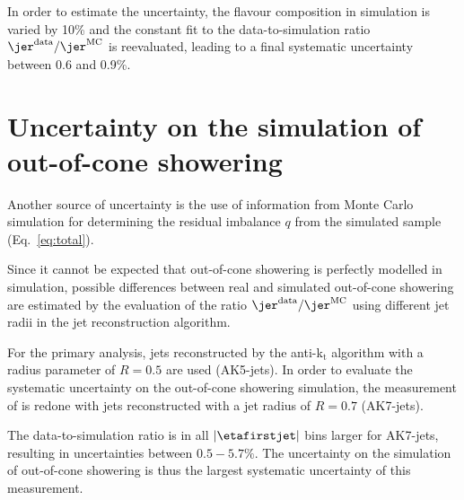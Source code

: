 In order to estimate the uncertainty, the flavour composition in simulation is varied by 10\% 
and the constant fit to the data-to-simulation ratio $\jer^{\text{data}}/\jer^{\text{MC}}$ is reevaluated, leading to a final systematic uncertainty between 0.6 and 0.9\%.

\section*{Uncertainty on the simulation of out-of-cone showering}
Another source of uncertainty is the use of information from Monte Carlo simulation for determining the residual imbalance $q$ from the simulated \GAMJET sample (Eq.~\eqref{eq:total}).

Since it cannot be expected that out-of-cone showering is perfectly modelled in simulation, possible differences between real and simulated out-of-cone showering are estimated by the evaluation of the ratio $\jer^{\text{data}}/\jer^{\text{MC}}$ using different jet radii in the jet reconstruction algorithm. 

For the primary analysis, jets reconstructed by the anti-k$_{\text{t}}$ algorithm with a radius parameter of $R=0.5$ are used (AK5-jets). 
In order to evaluate the systematic uncertainty on the out-of-cone showering simulation, the measurement of \rhores is redone with jets reconstructed with a jet radius of $R=0.7$ (AK7-jets). 

The data-to-simulation ratio is in all $|\etafirstjet|$ bins larger for AK7-jets, resulting in uncertainties between $0.5-5.7\%$.
The uncertainty on the simulation of out-of-cone showering is thus the largest systematic uncertainty of this measurement.


